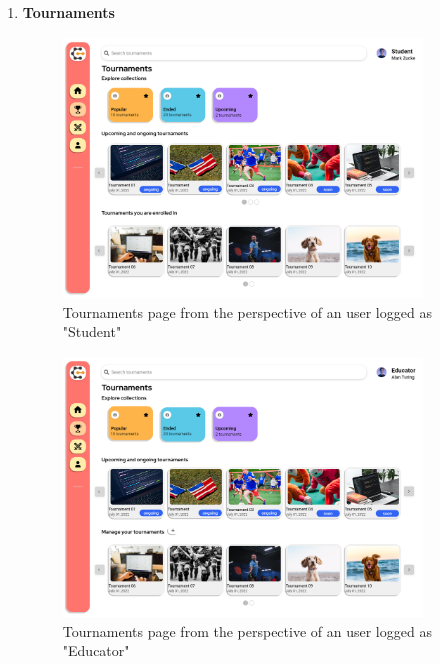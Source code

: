 \begin{enumerate}[label=\textbf{F\arabic*)}]
    \item \textbf{Tournaments}\\
    \begin{figure}[H]
        \centering
        \includegraphics[width=0.9\textwidth]{Mockups/4_student_tournaments.png}
        \caption{Tournaments page from the perspective of an user logged as "Student"}
    \end{figure}
    \begin{figure}[H]
        \centering
        \includegraphics[width=0.9\textwidth]{Mockups/5_educator_tournaments.png}
        \caption{Tournaments page from the perspective of an user logged as "Educator"}
    \end{figure}
    \begin{figure}[H]
        \centering

\end{figure}
\end{enumerate}
